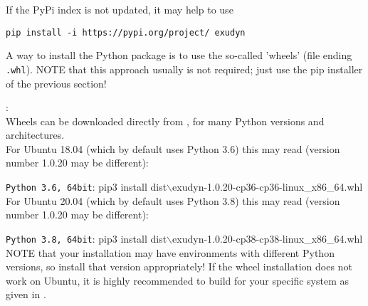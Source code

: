 If the PyPi index is not updated, it may help to use 
\bi 
  \item[] \texttt{pip install -i https://pypi.org/project/ exudyn}
\ei

A way to install the Python package \codeName is to use the so-called 'wheels' (file ending \texttt{.whl}).
NOTE that this approach usually is not required; just use the pip installer of the previous section!

\noindent {}:\vspace{6pt}\\
Wheels can be downloaded directly from , for many Python versions and architectures.
\vspace{6pt}\\
For Ubuntu 18.04 (which by default uses Python 3.6) this may read (version number 1.0.20 may be different):
\bi
  \item \texttt{Python 3.6, 64bit}: pip3 install dist$\backslash$exudyn-1.0.20-cp36-cp36-linux\_x86\_64.whl
\ei
For Ubuntu 20.04 (which by default uses Python 3.8) this may read (version number 1.0.20 may be different):
\bi
  \item \texttt{Python 3.8, 64bit}: pip3 install dist$\backslash$exudyn-1.0.20-cp38-cp38-linux\_x86\_64.whl
\ei
NOTE that your installation may have environments with different Python versions, so install that \codeName version appropriately!
If the wheel installation does not work on Ubuntu, it is highly recommended to build \codeName for your specific system as given in .

